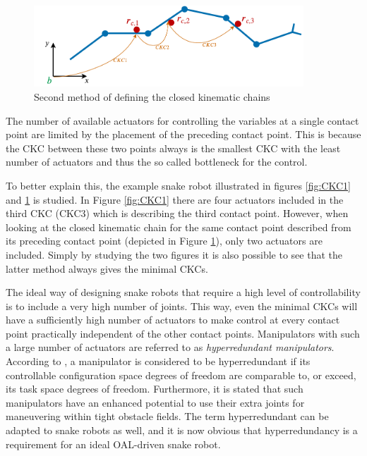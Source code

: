 \begin{figure}[h!]
    \centering
    \includegraphics[width=0.9\textwidth]{figures/theory/CKC2.pdf}
    \caption{Second method of defining the closed kinematic chains}
    \label{fig:CKC2}
\end{figure}

The number of available actuators for controlling the variables at a single contact point are limited by the placement of the preceding contact point. This is because the CKC between these two points always is the smallest CKC with the least number of actuators and thus the so called bottleneck for the control.

To better explain this, the example snake robot illustrated in figures \ref{fig:CKC1} and \ref{fig:CKC2} is studied. In Figure \ref{fig:CKC1} there are four actuators included in the third CKC (CKC3) which is describing the third contact point. However, when looking at the closed kinematic chain for the same contact point described from its preceding contact point (depicted in Figure \ref{fig:CKC2}), only two actuators are included. Simply by studying the two figures it is also possible to see that the latter method always gives the minimal CKCs.

The ideal way of designing snake robots that require a high level of controllability is to include a very high number of joints. This way, even the minimal CKCs will have a sufficiently high number of actuators to make control at every contact point practically independent of the other contact points. Manipulators with such a large number of actuators are referred to as \textit{hyperredundant manipulators}. According to \cite{chiaverini2008kinematically}, a manipulator is considered to be hyperredundant if its controllable configuration space degrees of freedom are comparable to, or exceed, its task space degrees of freedom. Furthermore, it is stated that such manipulators have an enhanced potential to use their extra joints for maneuvering within tight obstacle fields. The term hyperredundant can be adapted to snake robots as well, and it is now obvious that hyperredundancy is a requirement for an ideal OAL-driven snake robot.

